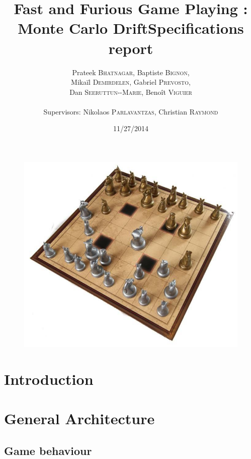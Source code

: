 \documentclass[12pt]{article}
\title{Fast and Furious Game Playing : Monte Carlo Drift\smallbreak Specifications report} %
\author{Prateek \textsc{Bhatnagar}, Baptiste \textsc{Bignon}, \\
        Mikaïl \textsc{Demirdelen}, Gabriel \textsc{Prevosto}, \\
        Dan \textsc{Seeruttun-{}-Marie}, Benoît \textsc{Viguier} \\
        \\
        Supervisors: Nikolaos \textsc{Parlavantzas}, Christian \textsc{Raymond}}
\date{11/27/2014}
\begin{document}
\maketitle

\begin{figure}[!h] 
\centerline{\includegraphics[scale=0.50]{Pictures/arimaa}}
\end{figure}
\newpage


\begin{abstract}
	
\end{abstract}
\newpage

\tableofcontents
\newpage


\section{Introduction}						\label{sec:introduction} 			
\newpage

\section{General Architecture}					\label{sec:generalArchitecture}
	\subsection{Game behaviour}				\label{sec:gameBehavioiur}		
\end{document}
